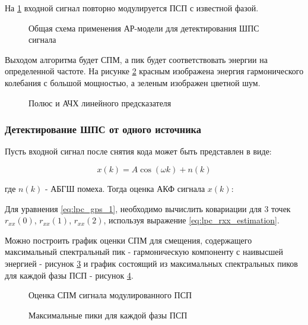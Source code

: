 На \ref{pic:lpc_basic1} входной сигнал повторно модулируется ПСП с известной фазой.

\begin{figure}[H]
	\center{}
	\caption{Общая схема применения АР-модели для детектирования ШПС сигнала}
	\label{pic:lpc_basic1}
\end{figure}

Выходом алгоритма будет СПМ, а пик будет соответствовать энергии на определенной частоте. На рисунке
\ref{pic:lpc_poles_gps} красным изображена энергия гармонического колебания с большой мощностью, а
зеленым изображен цветной шум.
\begin{figure}[H]
	\center{}
	\caption{Полюс и АЧХ линейного предсказателя}
	\label{pic:lpc_poles_gps}
\end{figure}

\subsubsection{Детектирование ШПС от одного источника}
Пусть входной сигнал после снятия кода может быть представлен в виде:

\begin{center}
\begin{equation}
	\label{eq:lpc_signal_model}
	x(k)=A \cos{(\omega k)} + n(k)
\end{equation}
\end{center}

где ${n(k)}$ - АБГШ помеха. Тогда оценка АКФ сигнала ${x(k)}$:

Для уравнения \ref{eq:lpc_gps_1}, необходимо вычислить ковариации для 3 точек
${r_{xx}(0)}$, ${r_{xx}(1)}$, ${r_{xx}(2)}$, используя выражение \ref{eq:lpc_rxx_estimation}.

Можно построить график оценки СПМ для смещения,
содержащего максимальный спектральный пик - гармоническую компоненту
с наивысшей энергией - рисунок \ref{pic:lpc_psd_1} и график состоящий из максимальных спектральных пиков для каждой фазы
ПСП - рисунок \ref{pic:lpc_1sat_energy}.

\begin{figure}[H]
	\center{}
	\caption{Оценка СПМ сигнала модулированного ПСП}
	\label{pic:lpc_psd_1}
\end{figure}
\begin{figure}[H]
	\center{}
	\caption{Максимальные пики для каждой фазы ПСП}
	\label{pic:lpc_1sat_energy}
\end{figure}

